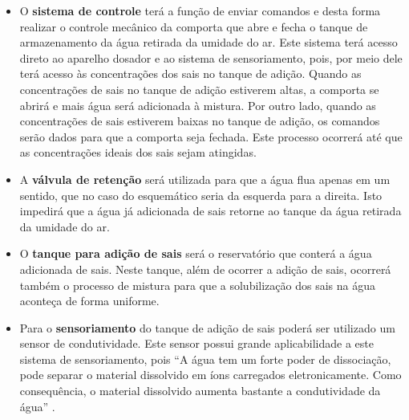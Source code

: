   \begin{itemize}
   
   \item O \textbf{sistema de controle} terá a função de enviar comandos e desta forma realizar o controle mecânico da comporta 
   que abre e fecha o tanque de armazenamento da água retirada da umidade do ar. Este sistema terá acesso direto ao aparelho
   dosador e ao sistema de sensoriamento, pois, por meio dele terá acesso às concentrações dos sais no tanque de adição. 
   Quando as concentrações de sais no tanque de adição estiverem altas, a comporta se abrirá e mais água será adicionada à 
   mistura. Por outro lado, quando as concentrações de sais estiverem baixas no tanque de adição, os comandos serão dados
   para que a comporta seja fechada. Este processo ocorrerá até que as concentrações ideais dos sais sejam atingidas.
   
   \item A \textbf{válvula de retenção} será utilizada para que a água flua apenas em um sentido, que no caso do esquemático 
   seria da esquerda para a direita. Isto impedirá que a água já adicionada de sais retorne ao tanque da água retirada da
   umidade do ar.
   
   \item O \textbf{tanque para adição de sais} será o reservatório que conterá a água adicionada de sais. Neste tanque, além
   de ocorrer a adição de sais, ocorrerá também o processo de mistura para que a solubilização dos sais na água aconteça de
   forma uniforme.
   
   \item Para o \textbf{sensoriamento} do tanque de adição de sais poderá ser utilizado um sensor de condutividade.
   Este sensor possui grande aplicabilidade a este sistema de sensoriamento, pois “A água tem um forte poder de dissociação,
   pode separar o material dissolvido em íons carregados eletronicamente. Como consequência, o material dissolvido aumenta
   bastante a condutividade da água” \cite{abilio05}.

   
  \end{itemize}
